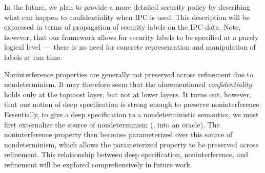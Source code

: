 In the future, we plan to provide a more detailed
security policy by describing what can happen to confidentiality when IPC is used.
This description will be expressed in terms of propagation of security labels
on the IPC data. Note, however, that our framework allows for security labels
to be specified at a purely logical level~--- there is no need for
concrete representation and manipulation of labels at run time.

Noninterference properties are 
generally not preserved across refinement due to nondeterminism. It may therefore 
seem that the aforementioned \emph{confidentiality} holds only at the topmost layer, but not at
lower layers. It turns out, however, that our notion of deep specification
is strong enough to preserve noninterference. Essentially, to give 
a deep specification to a nondeterministic semantics, we must first externalize
the source of nondeterminism (\eg, into an oracle). The noninterference property
then becomes parameterized over this source of nondeterminism, which allows the
parameterized property to be preserved across refinement. This relationship 
between deep specification, noninterference, and refinement will be explored
comprehensively in future work.
